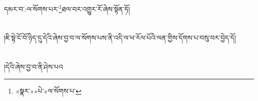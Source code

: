 དམར་བ་:ལ་སོགས་པར་\footnote{«སྣར་»«པེ་»ལ་སོགས་པ་}ཐལ་བར་འགྱུར་རོ་ཞེས་སྟོན་ཏོ།\chapter{ }།ཇི་སྟེ་ངོ་བོ་ཉིད་དུ་དེའི་ཞེས་བྱ་བ་ལ་སོགས་པས་ནི་འདི་ལ་ཕ་རོལ་པོའི་ལན་གྱིས་དོགས་པ་བསུ་བར་བྱེད་དོ།\chapter{ }།དེའི་ཞེས་བྱ་བ་ནི་ཤེས་པའ